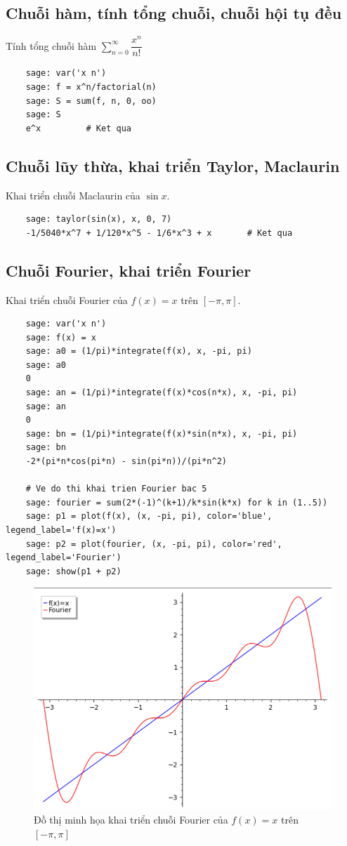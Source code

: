 \subsection{Chuỗi hàm, tính tổng chuỗi, chuỗi hội tụ đều}
Tính tổng chuỗi hàm $\sum_{n=0}^{\infty}{\dfrac{x^n}{n!}}$
\begin{lstlisting}
	sage: var('x n')
	sage: f = x^n/factorial(n)
	sage: S = sum(f, n, 0, oo)
	sage: S
	e^x			# Ket qua
\end{lstlisting}

\subsection{Chuỗi lũy thừa, khai triển Taylor, Maclaurin}
Khai triển chuỗi Maclaurin của $\sin{x}$.
\begin{lstlisting}
	sage: taylor(sin(x), x, 0, 7)
	-1/5040*x^7 + 1/120*x^5 - 1/6*x^3 + x		# Ket qua
\end{lstlisting}

\subsection{Chuỗi Fourier, khai triển Fourier}
Khai triển chuỗi Fourier của $f(x)=x$ trên $\left[-\pi,\pi\right]$.
\begin{lstlisting}
	sage: var('x n')
	sage: f(x) = x
	sage: a0 = (1/pi)*integrate(f(x), x, -pi, pi)
	sage: a0
	0
	sage: an = (1/pi)*integrate(f(x)*cos(n*x), x, -pi, pi)
	sage: an
	0
	sage: bn = (1/pi)*integrate(f(x)*sin(n*x), x, -pi, pi)
	sage: bn
	-2*(pi*n*cos(pi*n) - sin(pi*n))/(pi*n^2)

	# Ve do thi khai trien Fourier bac 5
	sage: fourier = sum(2*(-1)^(k+1)/k*sin(k*x) for k in (1..5))
	sage: p1 = plot(f(x), (x, -pi, pi), color='blue', legend_label='f(x)=x')
	sage: p2 = plot(fourier, (x, -pi, pi), color='red', legend_label='Fourier')
	sage: show(p1 + p2)
\end{lstlisting}
\begin{figure}[H]
	\centering
	\includegraphics[width=0.7\linewidth]{images/534}
	\caption{Đồ thị minh họa khai triển chuỗi Fourier của $f(x)=x$ trên $\left[-\pi,\pi\right]$}
	\label{fig:534}
\end{figure}



